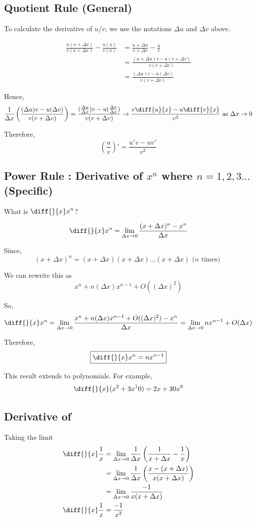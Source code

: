 \subsection{Quotient Rule (General)}

To calculate the derivative of $u/v$, we use the notations $\Delta u$ and $\Delta v$ above.

\begin{align*}
	\frac{u(x+\Delta x)}{v(x+\Delta x)} - \frac{u(x)}{v(x)}
		& = \frac{u + \Delta u}{v + \Delta v} - \frac{u}{v} \\
		& = \frac{(u+\Delta u)v - u(v+\Delta v)}{v(v+\Delta v)} \\
		& = \frac{(\Delta u)v - u(\Delta v)}{v(v+\Delta v)}
\end{align*}

Hence,
$$
\frac{1}{\Delta x} \left( \frac{(\Delta u)v - u(\Delta v)}{v(v+\Delta v)} \right)
	= \frac{(\frac{\Delta u}{\Delta x})v - u(\frac{\Delta v}{\Delta x})}{v(v+\Delta v)}
	\to \frac{v\diff{u}{x} - u\diff{v}{x}}{v^2} \text{ as } \Delta x \to 0
$$

Therefore,
$$\left( \frac{u}{v} \right)' = \frac{u'v - uv'}{v^2}$$



\subsection{Power Rule : Derivative of $x^n$ where $n = 1,2,3\ldots$ (Specific)}

What is $\displaystyle{ \diff{}{x} x^n }$?

$$ \diff{}{x} x^n = \lim_{\Delta x \to 0} \frac{(x+\Delta x)^n - x^n}{\Delta x} $$

Since, $$ (x+\Delta x)^n = (x+\Delta x)(x+\Delta x)\ldots(x+\Delta x) \text{ ($n$ times) } $$

We can rewrite this as $$ x^n + n(\Delta x)x^{n-1} + O((\Delta x)^2) $$

So, $$ \diff{}{x} x^n = \lim_{\Delta x \to 0} \frac{x^n + n(\Delta x)x^{n-1} + O((\Delta x)^2) - x^n}{\Delta x} = \lim_{\Delta x \to 0} nx^{n-1} + O(\Delta x) $$

Therefore, $$ \boxed{ \diff{}{x} x^n = nx^{n-1} } $$

This result extends to polynomials. For example, $$ \diff{}{x}(x^2+3x^10) = 2x + 30x^9 $$

\subsection{Derivative of }
Taking the limit
\begin{align*}
	\diff{}{x} \frac{1}{x}
		& = \lim_{\Delta x \to 0} \frac{1}{\Delta x} \left( \frac{1}{x+\Delta x} - \frac{1}{x} \right) \\
		& = \lim_{\Delta x \to 0} \frac{1}{\Delta x} \left( \frac{x - (x+\Delta x)}{x(x+\Delta x)} \right) \\
		& = \lim_{\Delta x \to 0} \frac{-1}{x(x+\Delta x)} \\
	\diff{}{x} \frac{1}{x} & = \frac{-1}{x^2}
\end{align*}
